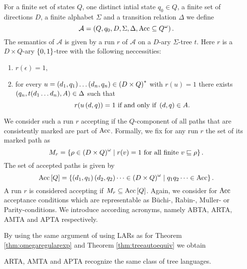\begin{definition}
  For a finite set of states $Q$, one distinct intial state $q_{0}\in Q$, a
  finite set of directions $D$, a finite alphabet $\Sigma$ and a transition
  relation $\Delta$ we define 
  \begin{equation*}
    \mathcal{A} = \left(Q, q_{0}, D, \Sigma, \Delta, \operatorname{Acc}\subseteq Q^{\omega}\right).
  \end{equation*}
  The semantics of $\mathcal{A}$ is given by a run $r$ of $\mathcal{A}$ on a
  $D$-ary $\Sigma$-tree $t$. Here $r$ is a $D\times Q$-ary $\left\{0,1\right\}$-tree 
  with the following neccessities:
  \begin{enumerate}
    \item $r(\epsilon) = 1$,
    \item for every $u = \left(d_{1}, q_{1}\right)\dots\left(d_{n}, q_{n}\right)\in
      \left(D\times Q\right)^{*}$ with $r(u) = 1$ there exists
      $\left(q_{n}, t(d_{1}\dots d_{n}), A\right)\in\Delta$ such that
      \begin{equation*}
        r(u\left(d, q\right)) = 1\text{ if and only if }\left(d, q\right)\in A.
      \end{equation*}
  \end{enumerate}
  We consider such a run $r$ accepting if the $Q$-component of all paths that 
  are consistently marked are part of $\operatorname{Acc}$. Formally, we fix for any run $r$ 
  the set of its marked path as
  \begin{equation*}
    M_{r} = \left\{
      \rho\in\left(D\times Q\right)^{\omega}\mid r(v) = 1\text{ for all finite }
        v\sqsubseteq\rho
    \right\}.
  \end{equation*}
  The set of accepted paths is given by
  \begin{equation*}
    \operatorname{Acc}\left[Q\right] = \left\{
      \left(d_{1}, q_{1}\right)\left(d_{2}, q_{2}\right)\dots\in
      \left(D\times Q\right)^{\omega}\mid q_{1}q_{2}\dots\in\operatorname{Acc}
    \right\}.
  \end{equation*}
  A run $r$ is considered accepting if $M_{r}\subseteq\operatorname{Acc}\left[Q\right]$.
  Again, we consider for $\operatorname{Acc}$ acceptance conditions which are representable
  as Büchi-, Rabin-, Muller- or Parity-conditions. We introduce according
  acronyms, namely \ac{ABTA}, \ac{ARTA}, \ac{AMTA} and \ac{APTA} respectively.
\end{definition}
By using the same argument of using \acp{LAR} as for Theorem 
\ref{thm:omegaregularexp} and Theorem \ref{thm:treeautoequiv} we obtain
\begin{theorem}
  \ac{ARTA}, \ac{AMTA} and \ac{APTA} recognize the same class of tree
  languages.
  \label{thm:atreeautoequiv}
\end{theorem}
